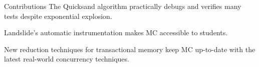 \documentclass[xcolor=dvipsnames]{beamer}
\newcommand\hilight[2]{\color{#1}#2\color{black}}
\begin{document}
\begin{frame}{Contributions}
	\hilight{sect-quicksand}{The Quicksand algorithm %
	practically debugs and verifies many tests despite exponential explosion.}
	\vspace{4.00em}

	\hilight{sect-410}{Landslide's automatic instrumentation makes MC accessible to students.}
	\vspace{4.58em}

	\hilight{sect-htm}{New reduction techniques for transactional memory keep MC up-to-date
	with the latest real-world concurrency techniques.}
	\vspace{4.54em}

\end{frame}
\end{document}
